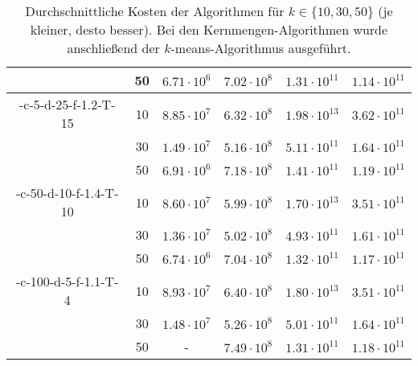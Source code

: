 \begin{table}[h]
\begin{tabular}{@{}cccccc@{}}
		 						& 50 & $6.71 \cdot 10^6$ & $7.02 \cdot 10^8$ & $1.31 \cdot 10^{11}$ & $1.14 \cdot 10^{11}$ \\
	\midrule
	\CsTwo-c-5-d-25-f-1.2-T-15	& 10 & $8.85 \cdot 10^7$ & $6.32 \cdot 10^8$ & $1.98 \cdot 10^{13}$ & $3.62 \cdot 10^{11}$ \\
			 					& 30 & $1.49 \cdot 10^7$ & $5.16 \cdot 10^8$ & $5.11 \cdot 10^{11}$ & $1.64 \cdot 10^{11}$ \\
		 						& 50 & $6.91 \cdot 10^6$ & $7.18 \cdot 10^8$ & $1.41 \cdot 10^{11}$ & $1.19 \cdot 10^{11}$ \\
	\midrule
	\CsTwo-c-50-d-10-f-1.4-T-10	& 10 & $8.60 \cdot 10^7$ & $5.99 \cdot 10^8$ & $1.70 \cdot 10^{13}$ & $3.51 \cdot 10^{11}$ \\
			 					& 30 & $1.36 \cdot 10^7$ & $5.02 \cdot 10^8$ & $4.93 \cdot 10^{11}$ & $1.61 \cdot 10^{11}$ \\
		 						& 50 & $6.74 \cdot 10^6$ & $7.04 \cdot 10^8$ & $1.32 \cdot 10^{11}$ & $1.17 \cdot 10^{11}$ \\
	\midrule
	\CsTwo-c-100-d-5-f-1.1-T-4	& 10 & $8.93 \cdot 10^7$ & $6.40 \cdot 10^8$ & $1.80 \cdot 10^{13}$ & $3.51 \cdot 10^{11}$ \\
			 					& 30 & $1.48 \cdot 10^7$ & $5.26 \cdot 10^8$ & $5.01 \cdot 10^{11}$ & $1.64 \cdot 10^{11}$ \\
		 						& 50 & - 				& $7.49 \cdot 10^8$ & $1.31 \cdot 10^{11}$ & $1.18 \cdot 10^{11}$ \\
	\bottomrule
\end{tabular}
\caption{Durchschnittliche Kosten der Algorithmen für $k \in \{ 10, 30, 50 \}$ (je kleiner, desto besser). Bei den
Kernmengen-Algorithmen wurde anschließend der $k$-means-Algorithmus ausgeführt.}
\label{tbl:experiment-coresets-costs-kmeans}
\end{table}
\newpage
